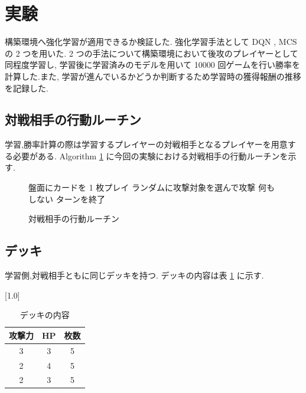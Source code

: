 \documentclass[twocolumn]{jarticle}
\begin{document}
\section{実験}
構築環境へ強化学習が適用できるか検証した.
強化学習手法として DQN , MCS の 2 つを用いた. 2 つの手法について構築環境において後攻のプレイヤーとして同程度学習し, 学習後に学習済みのモデルを用いて 10000 回ゲームを行い勝率を計算した.また, 学習が進んでいるかどうか判断するため学習時の獲得報酬の推移を記録した.

\subsection{対戦相手の行動ルーチン}

学習,勝率計算の際は学習するプレイヤーの対戦相手となるプレイヤーを用意する必要がある.
Algorithm \ref{alg1} に今回の実験における対戦相手の行動ルーチンを示す.
\begin{figure}[t]
  \begin{algorithm}[H]
      \caption{
        対戦相手の行動ルーチン
        }
      \label{alg1}
      \begin{algorithmic}[1] 
      \STATE 盤面にカードを 1 枚プレイ
      \STATE ランダムに攻撃対象を選んで攻撃
      \ELSE
      \STATE 何もしない
      \ENDIF
      \ENDFOR
      \STATE ターンを終了
      \end{algorithmic}
  \end{algorithm}
  \end{figure}


\subsection{デッキ}
学習側,対戦相手ともに同じデッキを持つ.
デッキの内容は表 \ref{table:deck} に示す.
\begin{table}[t]
  \centering
  \caption{デッキの内容}
  \label{table:deck}
  \vspace{-0.3cm}
  \scalebox{1.0}[1.0]{
    \begin{tabular}{|c|c|c|}
      \hline
      攻撃力 &  HP  & 枚数 \\ \hline \hline
      3 & 3 & 5  \\ \hline
      2 & 4 & 5  \\ \hline
      2 & 3 & 5  \\ \hline
      \end{tabular}
  }
  \end{table}
\end{document}
